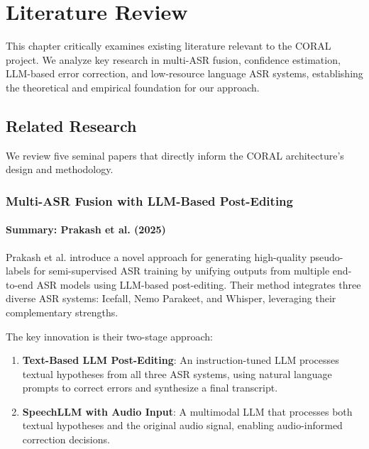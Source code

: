 \chapter{Literature Review}
\label{sec:literature}

This chapter critically examines existing literature relevant to the CORAL project. We analyze key research in multi-ASR fusion, confidence estimation, LLM-based error correction, and low-resource language ASR systems, establishing the theoretical and empirical foundation for our approach.

\section{Related Research}

We review five seminal papers that directly inform the CORAL architecture's design and methodology.

\subsection{Multi-ASR Fusion with LLM-Based Post-Editing}

\subsubsection{Summary: Prakash et al. (2025)}

Prakash et al. \cite{prakash2025} introduce a novel approach for generating high-quality pseudo-labels for semi-supervised ASR training by unifying outputs from multiple end-to-end ASR models using LLM-based post-editing. Their method integrates three diverse ASR systems: Icefall, Nemo Parakeet, and Whisper, leveraging their complementary strengths.

The key innovation is their two-stage approach:

\begin{enumerate}
    \item \textbf{Text-Based LLM Post-Editing}: An instruction-tuned LLM processes textual hypotheses from all three ASR systems, using natural language prompts to correct errors and synthesize a final transcript.
    
    \item \textbf{SpeechLLM with Audio Input}: A multimodal LLM that processes both textual hypotheses and the original audio signal, enabling audio-informed correction decisions.
\end{enumerate}

